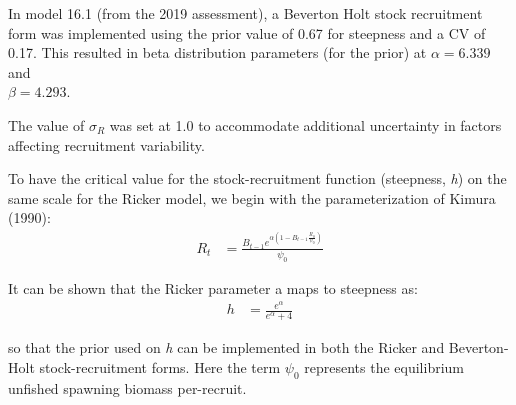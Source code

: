 \documentclass[11pt,
  english,
  a4paper,
]{article}
\begin{document}
\leavevmode\tagmcend\tagstructend\par


In model 16.1 (from the 2019 assessment), a Beverton Holt stock recruitment form was implemented using the prior value of 0.67 for steepness and a CV of 0.17. This resulted in beta distribution parameters (for the prior) at {\(\alpha = 6.339\)\leavevmode\tagmcend\tagstructend} and\\
{\(\beta = 4.293\)\leavevmode\tagmcend\tagstructend}.

\leavevmode\tagmcend\tagstructend\par


The value of {\(\sigma_R\)\leavevmode\tagmcend\tagstructend} was set at 1.0 to accommodate additional uncertainty in factors affecting recruitment variability.

\leavevmode\tagmcend\tagstructend\par


To have the critical value for the stock-recruitment function (steepness, \emph{h}) on the same scale for the Ricker model, we begin with the parameterization of Kimura (1990): \begin{align}
R_t &= \frac{B_{t-1}e^{\alpha \left(1-B_{t-1} \frac{R_0}{\psi_0} \right)}}{\psi_0}
\end{align}

\leavevmode\tagmcend\tagstructend\par


It can be shown that the Ricker parameter a maps to steepness as: \begin{align}
h &= \frac{e^\alpha}{e^\alpha+4}
\end{align}

\leavevmode\tagmcend\tagstructend\par


so that the prior used on \emph{h} can be implemented in both the Ricker and Beverton-Holt stock-recruitment forms. Here the term {\(\psi_0\)\leavevmode\tagmcend\tagstructend} represents the equilibrium unfished spawning biomass per-recruit.
\end{document}
